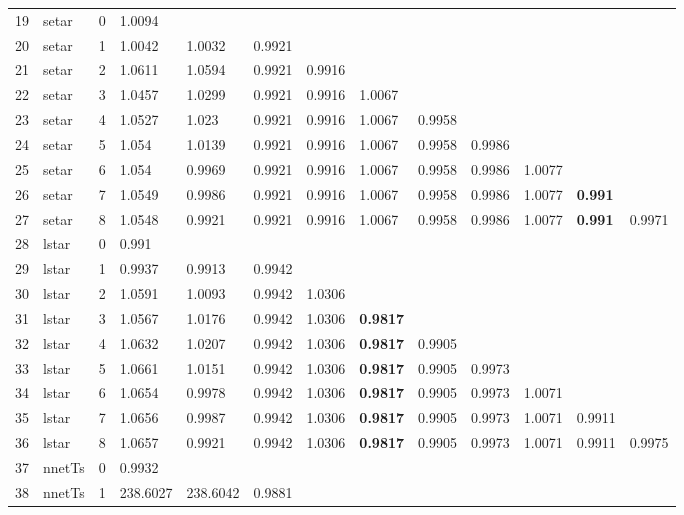 \documentclass[10pt,a4paper]{article}
\begin{document}
\begin{table}[ht]
\begin{tabular}{rlrllllllllll}
   \hline
19 & setar &     0 & 1.0094 &  &  &  &  &  &  &  &  &  \\ 
  20 & setar &     1 & 1.0042 & 1.0032 & 0.9921 &  &  &  &  &  &  &  \\ 
  21 & setar &     2 & 1.0611 & 1.0594 & 0.9921 & 0.9916 &  &  &  &  &  &  \\ 
  22 & setar &     3 & 1.0457 & 1.0299 & 0.9921 & 0.9916 & 1.0067 &  &  &  &  &  \\ 
  23 & setar &     4 & 1.0527 & 1.023 & 0.9921 & 0.9916 & 1.0067 & 0.9958 &  &  &  &  \\ 
  24 & setar &     5 & 1.054 & 1.0139 & 0.9921 & 0.9916 & 1.0067 & 0.9958 & 0.9986 &  &  &  \\ 
  25 & setar &     6 & 1.054 & 0.9969 & 0.9921 & 0.9916 & 1.0067 & 0.9958 & 0.9986 & 1.0077 &  &  \\ 
  26 & setar &     7 & 1.0549 & 0.9986 & 0.9921 & 0.9916 & 1.0067 & 0.9958 & 0.9986 & 1.0077 & \textbf{0.991} &  \\ 
  27 & setar &     8 & 1.0548 & 0.9921 & 0.9921 & 0.9916 & 1.0067 & 0.9958 & 0.9986 & 1.0077 & \textbf{0.991} & 0.9971 \\ 
   \hline
28 & lstar &     0 & 0.991 &  &  &  &  &  &  &  &  &  \\ 
  29 & lstar &     1 & 0.9937 & 0.9913 & 0.9942 &  &  &  &  &  &  &  \\ 
  30 & lstar &     2 & 1.0591 & 1.0093 & 0.9942 & 1.0306 &  &  &  &  &  &  \\ 
  31 & lstar &     3 & 1.0567 & 1.0176 & 0.9942 & 1.0306 & \textbf{0.9817} &  &  &  &  &  \\ 
  32 & lstar &     4 & 1.0632 & 1.0207 & 0.9942 & 1.0306 & \textbf{0.9817} & 0.9905 &  &  &  &  \\ 
  33 & lstar &     5 & 1.0661 & 1.0151 & 0.9942 & 1.0306 & \textbf{0.9817} & 0.9905 & 0.9973 &  &  &  \\ 
  34 & lstar &     6 & 1.0654 & 0.9978 & 0.9942 & 1.0306 & \textbf{0.9817} & 0.9905 & 0.9973 & 1.0071 &  &  \\ 
  35 & lstar &     7 & 1.0656 & 0.9987 & 0.9942 & 1.0306 & \textbf{0.9817} & 0.9905 & 0.9973 & 1.0071 & 0.9911 &  \\ 
  36 & lstar &     8 & 1.0657 & 0.9921 & 0.9942 & 1.0306 & \textbf{0.9817} & 0.9905 & 0.9973 & 1.0071 & 0.9911 & 0.9975 \\ 
   \hline
37 & nnetTs &     0 & 0.9932 &  &  &  &  &  &  &  &  &  \\ 
  38 & nnetTs &     1 & 238.6027 & 238.6042 & 0.9881 &  &  &  &  &  &  &  \\ 

\end{tabular}
\end{table}
\end{document}

